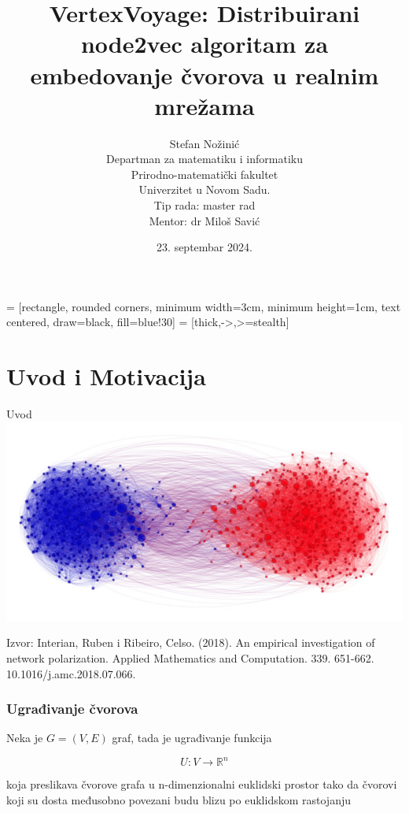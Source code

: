\documentclass{beamer}
\begin{document}
 = [rectangle, rounded corners, minimum width=3cm, minimum height=1cm, text centered, draw=black, fill=blue!30]
 = [thick,->,>=stealth]

\title{VertexVoyage: Distribuirani node2vec algoritam za embedovanje čvorova u realnim mrežama}
\author{Stefan Nožinić \\
Departman za matematiku i informatiku \\
Prirodno-matematički fakultet \\
Univerzitet u Novom Sadu. \\
Tip rada: master rad \\
Mentor: \MakeLowercase{dr} Miloš Savić
}
\date{23. septembar 2024.}

\frame{
\titlepage
}

\section{Uvod i Motivacija}
\begin{frame}{Uvod}
    \includegraphics[width=\textwidth]{png/uvod.png}
    \begin{footnotesize}
        Izvor: Interian, Ruben i Ribeiro, Celso. (2018). An empirical investigation of network polarization. Applied Mathematics and Computation. 339. 651-662. 10.1016/j.amc.2018.07.066.
    \end{footnotesize}
\end{frame}

\begin{frame}
	\frametitle{Ugrađivanje čvorova}
	Neka je $ G = (V, E) $ graf, tada je ugrađivanje funkcija 

	$$ U : V \to \mathbb{R}^n $$ 

	koja preslikava čvorove grafa u n-dimenzionalni euklidski prostor tako da čvorovi koji su dosta međusobno povezani budu blizu po euklidskom rastojanju
	

\end{frame}
\end{document}
